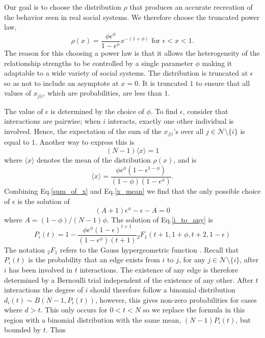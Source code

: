 \documentclass[10pt]{article}
\begin{document}
\begin{multicols}{2}
Our goal is to choose the distribution $\rho$ that produces an accurate recreation of the behavior seen in real social systems. We therefore choose the truncated power law,
\begin{equation}
\label{distribution}
\rho(x)=\frac{\phi\epsilon^{\phi}}{1-\epsilon^{\phi}}x^{-(1+\phi)} \text{ for } \epsilon<x<1.
\end{equation}
The reason for this choosing a power law is that it allows the heterogeneity of the relationship strengths to be controlled by a single parameter $\phi$ making it adaptable to a wide variety of social systems. The distribution is truncated at $\epsilon$ so as not to include an asymptote at $x=0$. It is truncated $1$ to ensure that all values of $x_{j|i}$, which are probabilities, are less than $1$.

The value of $\epsilon$ is determined by the choice of $\phi$. To find $\epsilon$, consider that interactions are pairwise; when $i$ interacts, exactly one other individual is involved. Hence, the expectation of the sum of the $x_{j|i}$'s over all $j\in \mathcal{N}\setminus\{i\}$ is equal to $1$. Another way to express this is
\begin{equation}
\label{sum_of_x}
(N-1) \langle x \rangle = 1
\end{equation}
where $\langle x \rangle$ denotes the mean of the distribution $\rho(x)$, and is
\begin{equation}
\label{x_mean}
\langle x \rangle=\frac{\phi\epsilon^{\phi}(1-\epsilon^{1-\phi})}{(1-\phi)(1-\epsilon^{\phi})}.
\end{equation}
Combining Eq.\eqref{sum_of_x} and Eq.\eqref{x_mean} we find that the only possible choice of $\epsilon$ is the solution of
\begin{equation}
\label{epsilon}
(A+1)\epsilon^{\phi}-\epsilon-A=0
\end{equation}
where $A=(1-\phi)/(N-1)\phi$. The solution of Eq.\eqref{i_to_any} is
\begin{equation}
\label{hyper_solution}
P_{i}(t)=1-\frac{\phi\epsilon^{\phi}(1-\epsilon)^{t+1}}{(1-\epsilon^{\phi})(t+1)}{}_{2}F_{1}(t+1, 1+\phi, t+2, 1-\epsilon)
\end{equation}
The notation ${}_{2}F_{1}$ refers to the Gauss hypergeometric function \cite{absteg}. Recall that $P_{i}(t)$ is the probability that an edge exists from $i$ to $j$, for any $j\in \mathcal{N}\setminus\{i\}$, after $i$ has been involved in $t$ interactions. The existence of any edge is therefore determined by a Bernoulli trial independent of the existence of any other. After $t$ interactions the degree of $i$ should therefore follow a binomial distribution $d_{i}(t)\sim B(N-1,P_{i}(t))$, however, this gives non-zero probabilities for cases where $d>t$. This only occurs for $0<t<N$ so we replace the formula in this region with a binomial distribution with the same mean, $(N-1)P_{i}(t)$, but bounded by $t$. Thus 

\end{multicols}
\end{document}
